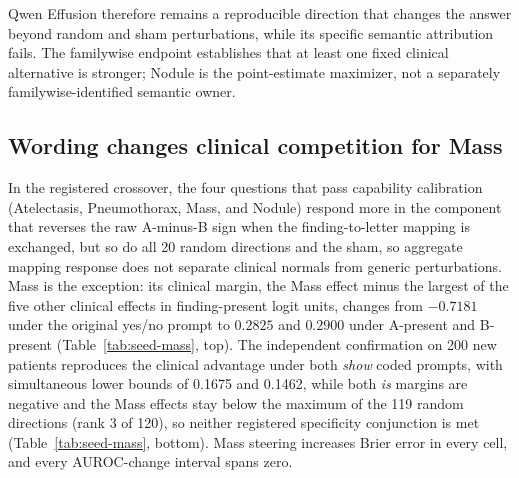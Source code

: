\documentclass{article}
\begin{document}
Qwen Effusion therefore remains a reproducible direction that changes the answer beyond random and sham perturbations, while its specific semantic attribution fails. The familywise endpoint establishes that at least one fixed clinical alternative is stronger; Nodule is the point-estimate maximizer, not a separately familywise-identified semantic owner.

\subsection{Wording changes clinical competition for Mass}
\label{sec:encoding-results}

In the registered crossover, the four questions that pass capability calibration (Atelectasis, Pneumothorax, Mass, and Nodule) respond more in the component that reverses the raw A-minus-B sign when the finding-to-letter mapping is exchanged, but so do all 20 random directions and the sham, so aggregate mapping response does not separate clinical normals from generic perturbations. Mass is the exception: its clinical margin, the Mass effect minus the largest of the five other clinical effects in finding-present logit units, changes from $-0.7181$ under the original yes/no prompt to $0.2825$ and $0.2900$ under A-present and B-present (Table~\ref{tab:seed-mass}, top). The independent confirmation on 200 new patients reproduces the clinical advantage under both \textit{show} coded prompts, with simultaneous lower bounds of 0.1675 and 0.1462, while both \textit{is} margins are negative and the Mass effects stay below the maximum of the 119 random directions (rank 3 of 120), so neither registered specificity conjunction is met (Table~\ref{tab:seed-mass}, bottom). Mass steering increases Brier error in every cell, and every AUROC-change interval spans zero.
\end{document}
